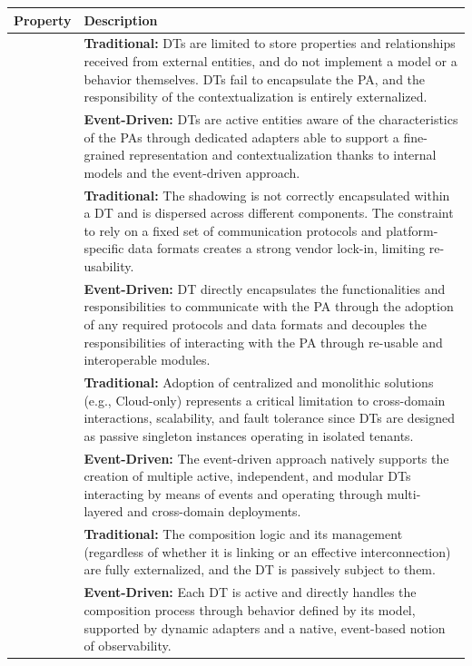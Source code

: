 \begin{table}
\renewcommand{\arraystretch}{1.2}
\centering
\small
\begin{tabularx}{\textwidth}{>{\arraybackslash}m{2.5cm} >{\arraybackslash}X}
\hline
\textbf{Property} & \textbf{Description} \\ \hline

\multirow{2}{*}{\parbox[t]{2.8cm}{\raggedright\arraybackslash\hspace{0pt}\textbf{Representativeness \& Contextualization}}}
& \textbf{Traditional:} DTs are limited to store properties and relationships received from external entities, and do not implement a model or a behavior themselves. DTs fail to encapsulate the PA, and the responsibility of the contextualization is entirely externalized. \\
& \textbf{Event-Driven:} DTs are active entities aware of the characteristics of the PAs through dedicated adapters able to support a fine-grained representation and contextualization thanks to internal models and the event-driven approach. \\ \hline

\multirow{2}{*}{\textbf{Shadowing}} 
& \textbf{Traditional:} The shadowing is not correctly encapsulated within a DT and is dispersed across different components. The constraint to rely on a fixed set of communication protocols and platform-specific data formats creates a strong vendor lock-in, limiting re-usability. \\
& \textbf{Event-Driven:} DT directly encapsulates the functionalities and responsibilities to communicate with the PA through the adoption of any required protocols and data formats and decouples the responsibilities of interacting with the PA through re-usable and interoperable modules. \\ \hline

\multirow{2}{*}{\textbf{Replication}} 
& \textbf{Traditional:} Adoption of centralized and monolithic solutions (e.g., Cloud-only) represents a critical limitation to cross-domain interactions, scalability, and fault tolerance since DTs are designed as passive singleton instances operating in isolated tenants. \\
& \textbf{Event-Driven:} The event-driven approach natively supports the creation of multiple active, independent, and modular DTs interacting by means of events and operating through multi-layered and cross-domain deployments. \\ \hline

\multirow{2}{*}{\textbf{Composability}} 
& \textbf{Traditional:} The composition logic and its management (regardless of whether it is linking or an effective interconnection) are fully externalized, and the DT is passively subject to them. \\
& \textbf{Event-Driven:} Each DT is active and directly handles the composition process through behavior defined by its model, supported by dynamic adapters and a native, event-based notion of observability. \\ \hline


\end{tabularx}
\end{table}
